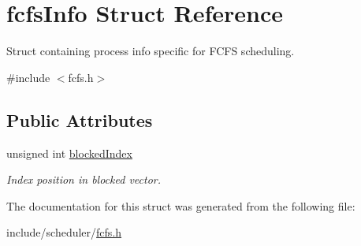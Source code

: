 \hypertarget{structfcfsInfo}{\section{fcfs\-Info \-Struct \-Reference}
\label{d5/d4c/structfcfsInfo}
}


\-Struct containing process info specific for \-F\-C\-F\-S scheduling.  




{\ttfamily \#include $<$fcfs.\-h$>$}

\subsection*{\-Public \-Attributes}
\begin{DoxyCompactItemize}
\item 
\hypertarget{structfcfsInfo_a994331c8dd9b432273d61e44e17807fd}{unsigned int \hyperlink{structfcfsInfo_a994331c8dd9b432273d61e44e17807fd}{blocked\-Index}}\label{d5/d4c/structfcfsInfo_a994331c8dd9b432273d61e44e17807fd}

\begin{DoxyCompactList}\small\item\em \-Index position in blocked vector. \end{DoxyCompactList}\end{DoxyCompactItemize}


\-The documentation for this struct was generated from the following file\-:\begin{DoxyCompactItemize}
\item 
include/scheduler/\hyperlink{fcfs_8h}{fcfs.\-h}\end{DoxyCompactItemize}
